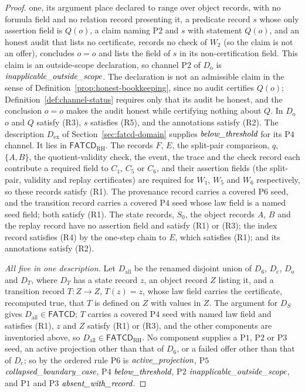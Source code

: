 \documentclass[11pt]{article}
\theoremstyle{definition}
\newcommand{\FATCD}{\ensuremath{\mathsf{FATCD}}}
\newcommand{\activeproj}{\textit{active\_\allowbreak projection}}
\newcommand{\belowthr}{\textit{below\_\allowbreak threshold}}
\newcommand{\collapsedbc}{\textit{collapsed\_\allowbreak boundary\_\allowbreak case}}
\newcommand{\absentrec}{\textit{absent\_\allowbreak with\_\allowbreak record}}
\newcommand{\outsidescope}{\textit{inapplicable\_\allowbreak outside\_\allowbreak scope}}
\newcommand{\Pone}{\ensuremath{\mathrm{P1}}}
\newcommand{\Ptwo}{\ensuremath{\mathrm{P2}}}
\newcommand{\Pthree}{\ensuremath{\mathrm{P3}}}
\newcommand{\Pfour}{\ensuremath{\mathrm{P4}}}
\newcommand{\Pfive}{\ensuremath{\mathrm{P5}}}
\newcommand{\Psix}{\ensuremath{\mathrm{P6}}}
\begin{document}
\begin{proof}
one, its argument place declared to range over object records, with no formula field and no relation record presenting it, a predicate
record \(s\) whose only assertion field is \(Q(o)\), a claim naming \Ptwo{} and
\(s\) with statement \(Q(o)\), and an honest audit that lists no certificate,
records no check of \(W_2\) (so the claim is not an offer), concludes \(o=o\)
and lists the field of \(s\) in its non-certification field. This claim is an
outside-scope declaration, so channel \Ptwo{} of \(D_{\mathrm{o}}\) is
\(\outsidescope\). The declaration is not an admissible claim in the sense of
Definition~\ref{prop:honest-bookkeeping}, since no audit certifies \(Q(o)\);
Definition~\ref{def:channel-status} requires only that its audit be honest, and
the conclusion \(o=o\) makes the audit honest while certifying nothing about
\(Q\). In \(D_{\mathrm{o}}\) \(o\) and \(Q\)
satisfy (R3), \(s\) satisfies (R5), and the annotations satisfy (R2). The
description \(D_{\mathrm{ex}}\) of Section~\ref{sec:fatcd-domain} supplies
\(\belowthr\) for its \Pfour{} channel. It lies in \(\FATCD_{\mathrm{RH}}\). The records \(F\), \(E\), the
split-pair comparison, \(q\), \(\{A,B\}\), the quotient-validity check, the
event, the trace and the check record each contribute a required field to
\(C_1\), \(C_5\) or \(C_6\), and their assertion fields (the split-pair,
validity and replay certificates) are required for \(W_1\), \(W_5\) and \(W_6\)
respectively, so these records satisfy (R1). The provenance record carries a
covered \Psix{} seed, and the transition record carries a covered \Pfour{} seed
whose law field is a named seed field; both satisfy (R1). The state records,
\(S_0\), the object records \(A\), \(B\) and the replay record have no assertion field and satisfy (R1) or
(R3); the index record satisfies (R4) by the one-step chain to \(E\), which satisfies
(R1); and its annotations satisfy (R2).
\par\emph{All five in one description.} Let \(D_{\mathrm{all}}\) be the renamed disjoint union of \(D_6\),
\(D_{\mathrm c}\), \(D_{\mathrm o}\) and \(D_T\), where \(D_T\) has a state record
\(z\), an object record \(Z\) listing it, and a transition record \(T:Z\to Z\),
\(T(z)=z\), whose law field carries the certificate, recomputed true, that \(T\)
is defined on \(Z\) with values in \(Z\). The argument for \(D_S\) gives
\(D_{\mathrm{all}}\in\FATCD{}\); \(T\) carries a covered \Pfour{} seed with named
law field and satisfies (R1), \(z\) and \(Z\) satisfy (R1) or (R3), and the other
components are inventoried above, so \(D_{\mathrm{all}}\in\FATCD_{\mathrm{RH}}\).
No component supplies a \Pone{}, \Ptwo{} or \Pthree{} seed, an active projection
other than that of \(D_6\), or a failed offer other than that of
\(D_{\mathrm c}\); so by the ordered rule \Psix{} is \(\activeproj\), \Pfive{}
\(\collapsedbc\), \Pfour{} \(\belowthr\), \Ptwo{} \(\outsidescope\), and \Pone{}
and \Pthree{} \(\absentrec\).
\end{proof}
\end{document}
